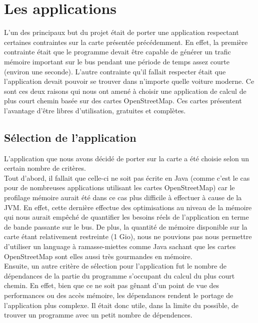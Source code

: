 \section{Les applications}

L'un des principaux but du projet était de porter une application respectant 
certaines contraintes sur la carte présentée précédemment. En effet, la 
première contrainte était que le programme devait être capable de générer un 
trafic mémoire important sur le bus pendant une période de temps assez courte 
(environ une seconde). L'autre contrainte qu'il fallait respecter était que 
l'application devait pouvoir se trouver dans n'importe quelle voiture moderne. 
Ce sont ces deux raisons qui nous ont amené à choisir une application de calcul 
de plus court chemin basée sur des cartes OpenStreetMap. Ces cartes présentent
l'avantage d'être libres d'utilisation, gratuites et complètes. 

\subsection{Sélection de l'application}

L'application que nous avons décidé de porter sur la carte a été choisie selon 
un certain nombre de critères. \\

Tout d'abord, il fallait que celle-ci ne soit pas écrite en Java (comme c'est 
le cas pour de nombreuses applications utilisant les cartes OpenStreetMap) car 
le profilage mémoire aurait été dans ce cas plus difficile à effectuer à cause 
de la JVM. En effet, cette dernière effectue des optimisations au niveau de la 
mémoire qui nous aurait empêché de quantifier les besoins réels de 
l'application en terme de bande passante sur le bus. De plus, la quantité de 
mémoire disponible sur la carte étant relativement restreinte (1 Gio), nous ne 
pouvions pas nous permettre d'utiliser un language à ramasse-miettes comme 
Java sachant que les cartes OpenStreetMap sont elles aussi très gourmandes en 
mémoire. \\

Ensuite, un autre critère de sélection pour l'application fut le nombre de 
dépendances de la partie du programme s'occupant du calcul du plus court 
chemin. En effet, bien que ce ne soit pas gênant d'un point de vue des 
performances ou des accès mémoire, les dépendances rendent le portage de 
l'application plus complexe. Il était donc utile, dans la limite du possible, 
de trouver un programme avec un petit nombre de dépendences. \\

